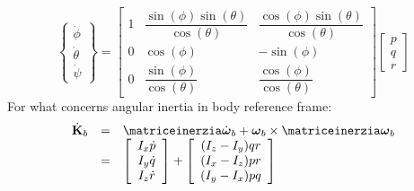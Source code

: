 \begin{equation}
\left\{ \begin{array}{c} \dot{\phi} \\ \dot{\theta} \\ \dot{\psi} \end{array} \right\} = 
\left[ \begin{array}{ccc}
 1 & \dfrac{\sin(\phi) \sin(\theta)}{\cos(\theta)} &  \dfrac{\cos(\phi) \sin(\theta)}{\cos(\theta)}\\
 0 & \cos(\phi) & -\sin(\phi) \\
 0 & \dfrac{\sin(\phi)}{\cos(\theta)} & \dfrac{\cos(\phi)}{\cos(\theta)} 
 \end{array} \right]
\left[ \begin{array}{c} p \\ q \\ r \end{array} \right]
\end{equation}
For what concerns angular inertia in body reference frame:
\begin{equation}
\begin{array}{rcl}
\dot{\mathbf{K}}_b &=& \matriceinerzia \dot{\boldsymbol{\omega}}_b + \boldsymbol{\omega}_b \times \matriceinerzia \boldsymbol{\omega}_b \\
&=& \left[ \begin{array}{c} I_x \dot{p} \\ I_y \dot{q} \\ I_z \dot{r} \end{array} \right] + \left[ \begin{array}{c} (I_z-I_y) q r \\ (I_x-I_z) p r \\ (I_y-I_x) p q \end{array} \right]
\end{array}
\end{equation}

